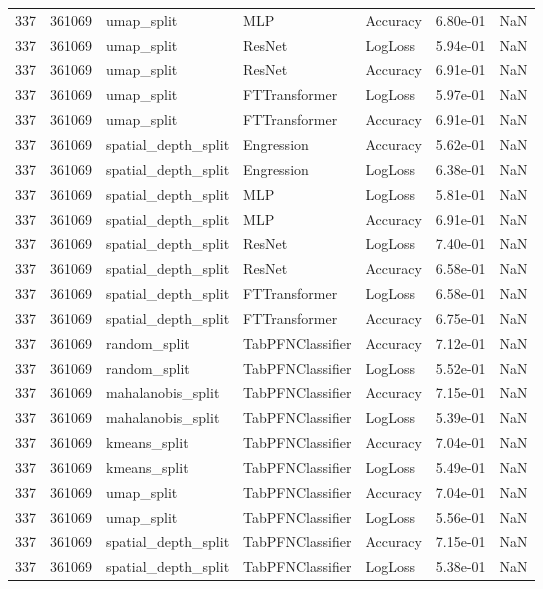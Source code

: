 \begin{tabular}{rrlllrr}
337 & 361069 & umap\_split & MLP & Accuracy & 6.80e-01 & NaN \\
337 & 361069 & umap\_split & ResNet & LogLoss & 5.94e-01 & NaN \\
337 & 361069 & umap\_split & ResNet & Accuracy & 6.91e-01 & NaN \\
337 & 361069 & umap\_split & FTTransformer & LogLoss & 5.97e-01 & NaN \\
337 & 361069 & umap\_split & FTTransformer & Accuracy & 6.91e-01 & NaN \\
337 & 361069 & spatial\_depth\_split & Engression & Accuracy & 5.62e-01 & NaN \\
337 & 361069 & spatial\_depth\_split & Engression & LogLoss & 6.38e-01 & NaN \\
337 & 361069 & spatial\_depth\_split & MLP & LogLoss & 5.81e-01 & NaN \\
337 & 361069 & spatial\_depth\_split & MLP & Accuracy & 6.91e-01 & NaN \\
337 & 361069 & spatial\_depth\_split & ResNet & LogLoss & 7.40e-01 & NaN \\
337 & 361069 & spatial\_depth\_split & ResNet & Accuracy & 6.58e-01 & NaN \\
337 & 361069 & spatial\_depth\_split & FTTransformer & LogLoss & 6.58e-01 & NaN \\
337 & 361069 & spatial\_depth\_split & FTTransformer & Accuracy & 6.75e-01 & NaN \\
337 & 361069 & random\_split & TabPFNClassifier & Accuracy & 7.12e-01 & NaN \\
337 & 361069 & random\_split & TabPFNClassifier & LogLoss & 5.52e-01 & NaN \\
337 & 361069 & mahalanobis\_split & TabPFNClassifier & Accuracy & 7.15e-01 & NaN \\
337 & 361069 & mahalanobis\_split & TabPFNClassifier & LogLoss & 5.39e-01 & NaN \\
337 & 361069 & kmeans\_split & TabPFNClassifier & Accuracy & 7.04e-01 & NaN \\
337 & 361069 & kmeans\_split & TabPFNClassifier & LogLoss & 5.49e-01 & NaN \\
337 & 361069 & umap\_split & TabPFNClassifier & Accuracy & 7.04e-01 & NaN \\
337 & 361069 & umap\_split & TabPFNClassifier & LogLoss & 5.56e-01 & NaN \\
337 & 361069 & spatial\_depth\_split & TabPFNClassifier & Accuracy & 7.15e-01 & NaN \\
337 & 361069 & spatial\_depth\_split & TabPFNClassifier & LogLoss & 5.38e-01 & NaN \\

\end{tabular}
